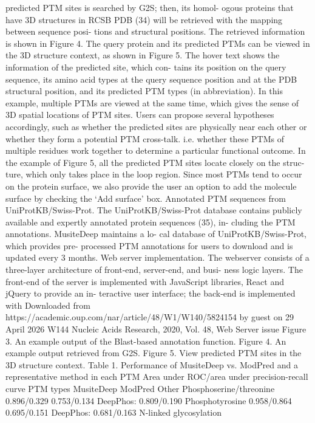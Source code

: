 predicted PTM sites is searched by G2S; then, its homol-
ogous proteins that have 3D structures in RCSB PDB (34)
will be retrieved with the mapping between sequence posi-
tions and structural positions. The retrieved information is
shown in Figure 4.
The query protein and its predicted PTMs can be viewed
in the 3D structure context, as shown in Figure 5. The hover
text shows the information of the predicted site, which con-
tains its position on the query sequence, its amino acid types
at the query sequence position and at the PDB structural
position, and its predicted PTM types (in abbreviation). In
this example, multiple PTMs are viewed at the same time,
which gives the sense of 3D spatial locations of PTM sites.
Users can propose several hypotheses accordingly, such as
whether the predicted sites are physically near each other or
whether they form a potential PTM cross-talk. i.e. whether
these PTMs of multiple residues work together to determine
a particular functional outcome. In the example of Figure
5, all the predicted PTM sites locate closely on the struc-
ture, which only takes place in the loop region. Since most
PTMs tend to occur on the protein surface, we also provide
the user an option to add the molecule surface by checking
the ‘Add surface’ box.
Annotated PTM sequences from UniProtKB/Swiss-Prot.
The UniProtKB/Swiss-Prot database contains publicly
available and expertly annotated protein sequences (35), in-
cluding the PTM annotations. MusiteDeep maintains a lo-
cal database of UniProtKB/Swiss-Prot, which provides pre-
processed PTM annotations for users to download and is
updated every 3 months.
Web server implementation.
The webserver consists of a
three-layer architecture of front-end, server-end, and busi-
ness logic layers. The front-end of the server is implemented
with JavaScript libraries, React and jQuery to provide an in-
teractive user interface; the back-end is implemented with
Downloaded from https://academic.oup.com/nar/article/48/W1/W140/5824154 by guest on 29 April 2026
W144 Nucleic Acids Research, 2020, Vol. 48, Web Server issue
Figure 3. An example output of the Blast-based annotation function.
Figure 4. An example output retrieved from G2S.
Figure 5. View predicted PTM sites in the 3D structure context.
Table 1. Performance of MusiteDeep vs. ModPred and a representative method in each PTM
Area under ROC/area under precision-recall curve
PTM types
MusiteDeep
ModPred
Other
Phosphoserine/threonine
0.896/0.329
0.753/0.134
DeepPhos: 0.809/0.190
Phosphotyrosine
0.958/0.864
0.695/0.151
DeepPhos: 0.681/0.163
N-linked glycosylation
